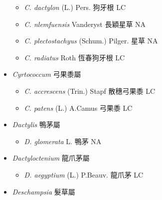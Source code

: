 \begin{itemize}
  \begin{itemize}
        \item[] \textit{C. dactylon} (L.) Pers.  狗牙根   LC
        \item[] \textit{C. nlemfuensis} Vanderyst  長穎星草   NA
        \item[] \textit{C. plectostachyus} (Schum.) Pilger.  星草   NA
        \item[] \textit{C. radiatus} Roth  恆春狗牙根   LC
  \end{itemize}
 \item[] \textit{Cyrtococcum} 弓果黍屬
                                
  \begin{itemize}
        \item[] \textit{C. accrescens} (Trin.) Stapf  散穗弓果黍   LC
        \item[] \textit{C. patens} (L.) A.Camus  弓果黍   LC
  \end{itemize}
 \item[] \textit{Dactylis} 鴨茅屬
                                
  \begin{itemize}
        \item[] \textit{D. glomerata} L.  鴨茅   NA
  \end{itemize}
 \item[] \textit{Dactyloctenium} 龍爪茅屬
                                
  \begin{itemize}
        \item[] \textit{D. aegyptium} (L.) P.Beauv.  龍爪茅   LC
  \end{itemize}
 \item[] \textit{Deschampsia} 髮草屬
                                

\end{itemize}
